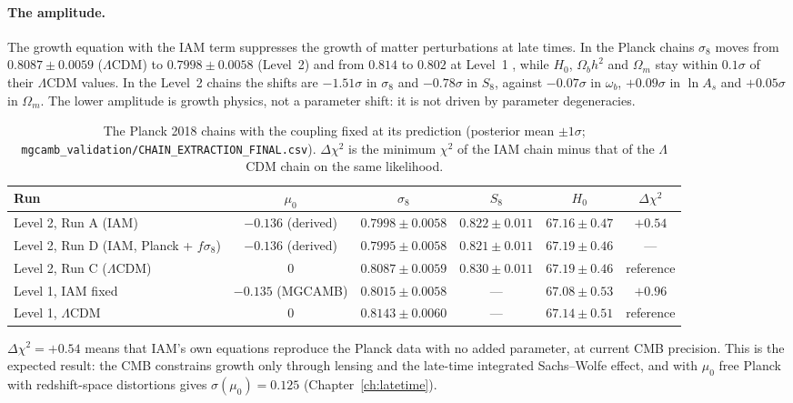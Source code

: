 \paragraph{The amplitude.} The growth equation with the IAM term suppresses the growth of matter perturbations at late times. In the Planck chains
$\sigma_8$ moves from $0.8087\pm0.0059$ ($\Lambda$CDM) to $0.7998\pm0.0058$ (Level~2) and from $0.814$ to $0.802$ at Level~1 \measured, while $H_0$,
$\Omega_bh^2$ and $\Omega_m$ stay within $0.1\sigma$ of their $\Lambda$CDM values. In the Level~2 chains the shifts are $-1.51\sigma$ in $\sigma_8$ and
$-0.78\sigma$ in $S_8$, against $-0.07\sigma$ in $\omega_b$, $+0.09\sigma$ in $\ln A_s$ and $+0.05\sigma$ in $\Omega_m$. The lower amplitude is growth
physics, not a parameter shift: it is not driven by parameter degeneracies.

\begin{table}[htbp]\centering\small
\caption{The Planck 2018 chains with the coupling fixed at its prediction (posterior mean $\pm1\sigma$; \texttt{mgcamb\_validation/\allowbreak{}CHAIN\_EXTRACTION\_FINAL.csv}).
$\Delta\chi^2$ is the minimum $\chi^2$ of the IAM chain minus that of the $\Lambda$CDM chain on the same likelihood. \measured}\label{tab:vc_chains}
\begin{adjustbox}{max width=\textwidth}
\begin{tabular}{lccccc}
\hline
Run & $\mu_0$ & $\sigma_8$ & $S_8$ & $H_0$ & $\Delta\chi^2$\\\hline
Level 2, Run A (IAM) & $-0.136$ (derived) & $0.7998\pm0.0058$ & $0.822\pm0.011$ & $67.16\pm0.47$ & $+0.54$\\
Level 2, Run D (IAM, Planck + $f\sigma_8$) & $-0.136$ (derived) & $0.7995\pm0.0058$ & $0.821\pm0.011$ & $67.19\pm0.46$ & ---\\
Level 2, Run C ($\Lambda$CDM) & 0 & $0.8087\pm0.0059$ & $0.830\pm0.011$ & $67.19\pm0.46$ & reference\\
Level 1, IAM fixed & $-0.135$ (MGCAMB) & $0.8015\pm0.0058$ & --- & $67.08\pm0.53$ & $+0.96$\\
Level 1, $\Lambda$CDM & 0 & $0.8143\pm0.0060$ & --- & $67.14\pm0.51$ & reference\\\hline
\end{tabular}
\end{adjustbox}
\end{table}
$\Delta\chi^2=+0.54$ means that IAM's own equations reproduce the Planck data with no added parameter, at current CMB precision. This is the expected result:
the CMB constrains growth only through lensing and the late-time integrated Sachs--Wolfe effect, and with $\mu_0$ free Planck with redshift-space
distortions gives $\sigma(\mu_0)=0.125$ (Chapter~\ref{ch:latetime}).

